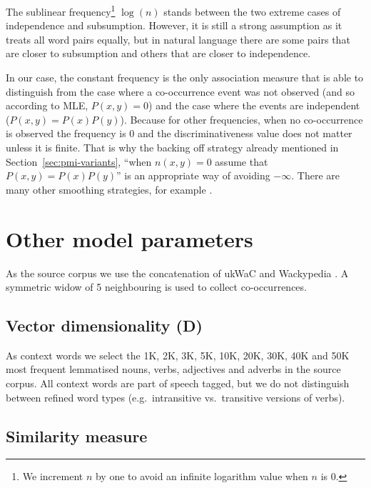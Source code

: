 The sublinear frequency\footnote{We increment $n$ by one to avoid an infinite logarithm value when $n$ is 0.} $\log(n)$ stands between the two extreme cases of independence and subsumption. However, it is still a strong assumption as it treats all word pairs equally, but in natural language there are some pairs that are closer to subsumption and others that are closer to independence.

In our case, the constant frequency is the only association measure that is able to distinguish from the case where a co-occurrence event was not observed (and so according to MLE, $P(x, y)= 0$) and the case where the events are independent ($P(x, y) = P(x)P(y)$). Because for other frequencies, when no co-occurrence is observed the frequency is 0 and the discriminativeness value does not matter unless it is finite. That is why the backing off strategy already mentioned in Section~\ref{sec:pmi-variants}, ``when $n(x, y) = 0$ assume that $P(x, y) = P(x)P(y)$'' is an appropriate way of avoiding $-\infty$. There are many other smoothing strategies, for example .

\section{Other model parameters}
\label{sec:other-model-paramt}



As the source corpus we use the concatenation of ukWaC and Wackypedia \cite{ukwac}.\footnotemark{} A symmetric widow of 5 neighbouring is used to collect co-occurrences.


\subsection{Vector dimensionality (D)}
\label{sec:vect-dimens}

As context words we select the 1K, 2K, 3K, 5K, 10K, 20K, 30K, 40K and 50K most frequent lemmatised nouns, verbs, adjectives and adverbs in the source corpus. All context words are part of speech tagged, but we do not distinguish between refined word types (e.g.~intransitive vs.~transitive versions of verbs).

\subsection{Similarity measure}
\label{sec:similarity-measure}

